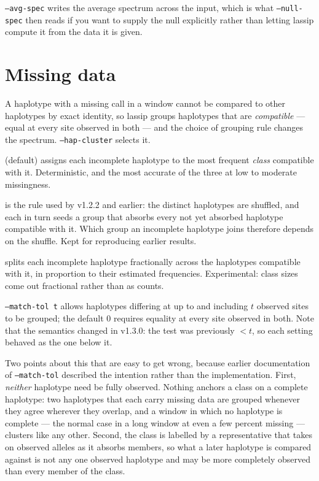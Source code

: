 \documentclass[11pt]{article}
\newcommand{\opt}[1]{\texttt{#1}}
\begin{document}
\opt{--avg-spec} writes the average spectrum across the input, which is what
\opt{--null-spec} then reads if you want to supply the null explicitly rather
than letting lassip compute it from the data it is given.

\section{Missing data}
\label{sec:missing}

A haplotype with a missing call in a window cannot be compared to other
haplotypes by exact identity, so lassip groups haplotypes that are
\emph{compatible} --- equal at every site observed in both --- and the choice
of grouping rule changes the spectrum. \opt{--hap-cluster} selects it.

\begin{description}[leftmargin=1.5em,style=sameline]
\item[\opt{best-comp}] (default) assigns each incomplete haplotype to the most
  frequent \emph{class} compatible with it. Deterministic, and the most accurate
  of the three at low to moderate missingness.
\item[\opt{garud-shuffle}] is the rule used by v1.2.2 and earlier: the distinct
  haplotypes are shuffled, and each in turn seeds a group that absorbs every
  not yet absorbed haplotype compatible with it. Which group an incomplete
  haplotype joins therefore depends on the shuffle. Kept for reproducing
  earlier results.
\item[\opt{soft-em}] splits each incomplete haplotype fractionally across the
  haplotypes compatible with it, in proportion to their estimated frequencies.
  Experimental: class sizes come out fractional rather than as counts.
\end{description}

\opt{--match-tol t} allows haplotypes differing at up to and including $t$
observed sites to be grouped; the default 0 requires equality at every site
observed in both. Note that the semantics changed in v1.3.0: the test was
previously $< t$, so each setting behaved as the one below it.

Two points about this that are easy to get wrong, because earlier
documentation of \opt{--match-tol} described the intention rather than the
implementation. First, \emph{neither} haplotype need be fully observed. Nothing
anchors a class on a complete haplotype: two haplotypes that each carry missing
data are grouped whenever they agree wherever they overlap, and a window in
which no haplotype is complete --- the normal case in a long window at even a
few percent missing --- clusters like any other. Second, the class is labelled
by a representative that takes on observed alleles as it absorbs members, so
what a later haplotype is compared against is not any one observed haplotype
and may be more completely observed than every member of the class.
\end{document}
